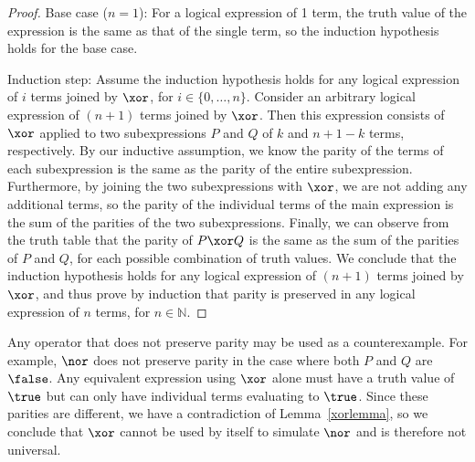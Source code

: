 \documentclass[12pt,oneside]{article}
\begin{document}
\begin{problem}{20}
{\begin{proof}
Base case ($n=1$): For a logical expression of 1 term, the truth value of the expression is the same as that of the single term, so the induction hypothesis holds for the base case.

Induction step: Assume the induction hypothesis holds for any logical expression of $i$ terms joined by $\xor$, for $i \in \{0,\ldots,n\}$. Consider an arbitrary logical expression of $(n+1)$ terms joined by $\xor$. Then this expression consists of $\xor$ applied to two subexpressions $P$ and $Q$ of $k$ and $n+1-k$ terms, respectively. By our inductive assumption, we know the parity of the terms of each subexpression is the same as the parity of the entire subexpression. Furthermore, by joining the two subexpressions with $\xor$, we are not adding any additional terms, so the parity of the individual terms of the main expression is the sum of the parities of the two subexpressions. Finally, we can observe from the truth table that the parity of $P \xor Q$ is the same as the sum of the parities of $P$ and $Q$, for each possible combination of truth values. We conclude that the induction hypothesis holds for any logical expression of $(n+1)$ terms joined by $\xor$, and thus prove by induction that parity is preserved in any logical expression of $n$ terms, for $n \in \mathbb{N}$.
\end{proof}


Any operator that does not preserve parity may be used as a counterexample. For example, $\nor$ does not preserve parity in the case where both $P$ and $Q$ are $\false$. Any equivalent expression using $\xor$ alone must have a truth value of $\true$ but can only have individual terms evaluating to $\true$. Since these parities are different, we have a contradiction of Lemma~\ref{xorlemma}, so we conclude that $\xor$ cannot be used by itself to simulate $\nor$ and is therefore not universal.

}
\eparts
\end{problem}





\end{document}
